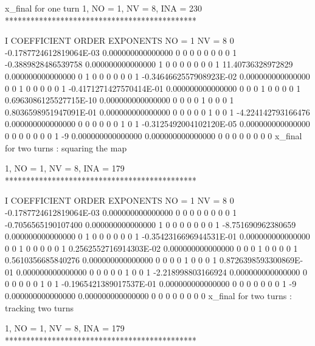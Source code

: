 \documentclass{hitec}     %
\begin{document}
{{{{{{    \begin{code}
x_final for one turn
          1, NO =    1, NV =    8, INA =  230
 *********************************************

    I  COEFFICIENT          ORDER   EXPONENTS
      NO =     1      NV =     8
   0 -0.1787724612819064E-03   0.000000000000000       0  0  0  0  0  0  0  0
   1 -0.3889828486539758       0.000000000000000       1  0  0  0  0  0  0  0
   1   11.40736328972829       0.000000000000000       0  1  0  0  0  0  0  0
   1 -0.3464662557908923E-02   0.000000000000000       0  0  1  0  0  0  0  0
   1 -0.4171271427570414E-01   0.000000000000000       0  0  0  1  0  0  0  0
   1  0.6963086125527715E-10   0.000000000000000       0  0  0  0  1  0  0  0
   1  0.8036598951947091E-01   0.000000000000000       0  0  0  0  0  1  0  0
   1  -4.224142793166476       0.000000000000000       0  0  0  0  0  0  1  0
   1 -0.3125492004102120E-05   0.000000000000000       0  0  0  0  0  0  0  1
    -9   0.000000000000000       0.000000000000000       0  0  0  0  0  0  0  0
 x_final for two turns : squaring the map

          1, NO =    1, NV =    8, INA =  179
 *********************************************

    I  COEFFICIENT          ORDER   EXPONENTS
      NO =     1      NV =     8
   0 -0.1787724612819064E-03   0.000000000000000       0  0  0  0  0  0  0  0
   1 -0.7056565190107400       0.000000000000000       1  0  0  0  0  0  0  0
   1  -8.751690962380659       0.000000000000000       0  1  0  0  0  0  0  0
   1 -0.3542316696944531E-01   0.000000000000000       0  0  1  0  0  0  0  0
   1  0.2562552716914303E-02   0.000000000000000       0  0  0  1  0  0  0  0
   1  0.5610356685840276       0.000000000000000       0  0  0  0  1  0  0  0
   1  0.8726398593300869E-01   0.000000000000000       0  0  0  0  0  1  0  0
   1  -2.218998803166924       0.000000000000000       0  0  0  0  0  0  1  0
   1 -0.1965421389017537E-01   0.000000000000000       0  0  0  0  0  0  0  1
    -9   0.000000000000000       0.000000000000000       0  0  0  0  0  0  0  0
 x_final for two turns : tracking two turns

          1, NO =    1, NV =    8, INA =  179
 *********************************************


\end{code}}}}}}}
\end{document}
